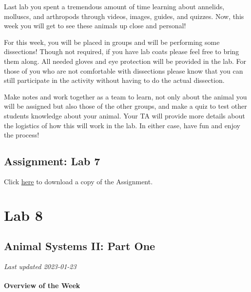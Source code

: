 \documentclass[
]{book}
\begin{document}
Last lab you spent a tremendous amount of time learning about annelids, molluscs, and arthropods through videos, images, guides, and quizzes. Now, this week you will get to see these animals up close and personal!

For this week, you will be placed in groups and will be performing some dissections! Though not required, if you have lab coats please feel free to bring them along. All needed gloves and eye protection will be provided in the lab. For those of you who are not comfortable with dissections please know that you can still participate in the activity without having to do the actual dissection.

Make notes and work together as a team to learn, not only about the animal you will be assigned but also those of the other groups, and make a quiz to test other students\textquotesingle{} knowledge about your animal. Your TA will provide more details about the logistics of how this will work in the lab. In either case, have fun and enjoy the process!

\hypertarget{assignment-lab-7}{%
\chapter*{Assignment: Lab 7}\label{assignment-lab-7}}

Click \href{https://osf.io/download/qzndp}{here} to download a copy of the Assignment.

\hypertarget{part-lab-8}{%
\part*{Lab 8}\label{part-lab-8}}

\hypertarget{animal-systems-ii-part-one}{%
\chapter*{Animal Systems II: Part One}\label{animal-systems-ii-part-one}}

\emph{Last updated 2023-01-23}

\hypertarget{overview-of-the-week-2}{%
\subsection*{Overview of the Week}\label{overview-of-the-week-2}}
\end{document}
